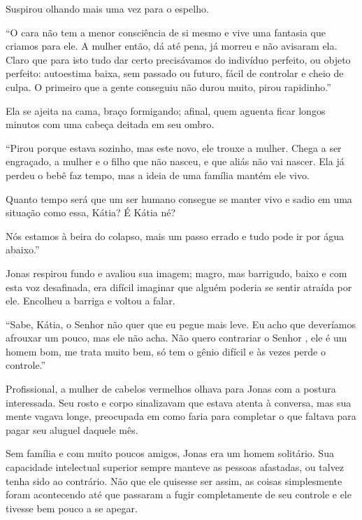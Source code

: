 Suspirou olhando mais uma vez para o espelho.

``O cara não tem a menor consciência de si mesmo e vive uma fantasia que
criamos para ele. A mulher então, dá até pena, já morreu e não avisaram
ela. Claro que para isto tudo dar certo precisávamos do indivíduo
perfeito, ou objeto perfeito: autoestima baixa, sem passado ou futuro,
fácil de controlar e cheio de culpa. O primeiro que a gente conseguiu
não durou muito, pirou rapidinho.''

Ela se ajeita na cama, braço formigando; afinal, quem aguenta ficar
longos minutos com uma cabeça deitada em seu ombro.

``Pirou porque estava sozinho, mas este novo, ele trouxe a mulher. Chega
a ser engraçado, a mulher e o filho que não nasceu, e que aliás não vai
nascer. Ela já perdeu o bebê faz tempo, mas a ideia de uma família
mantém ele vivo.

Quanto tempo será que um ser humano consegue se manter vivo e sadio em
uma situação como essa, Kátia? É Kátia né?

Nós estamos à beira do colapso, mais um passo errado e tudo pode ir por
água abaixo.''

Jonas respirou fundo e avaliou sua imagem; magro, mas barrigudo, baixo e
com esta voz desafinada, era difícil imaginar que alguém poderia se
sentir atraída por ele. Encolheu a barriga e voltou a falar.

``Sabe, Kátia, o Senhor  não quer que eu pegue mais leve. Eu acho que
deveríamos afrouxar um pouco, mas ele não acha. Não quero contrariar o
Senhor , ele é um homem bom, me trata muito bem, só tem
o gênio difícil e às vezes perde o controle.''

Profissional, a mulher de cabelos vermelhos olhava para Jonas com a
postura interessada. Seu rosto e corpo sinalizavam que estava atenta à
conversa, mas sua mente vagava longe, preocupada em como faria para
completar o que faltava para pagar seu aluguel daquele mês.

Sem família e com muito poucos amigos, Jonas era um homem solitário. Sua
capacidade intelectual superior sempre manteve as pessoas afastadas, ou
talvez tenha sido ao contrário. Não que ele quisesse ser assim, as
coisas simplesmente foram acontecendo até que passaram a fugir
completamente de seu controle e ele tivesse bem pouco a se apegar.

\asterisc


